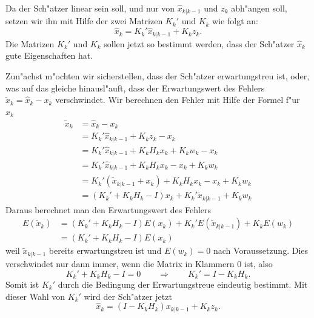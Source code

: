 Da der Sch"atzer linear sein soll, und nur von $\hat x_{k|k-1}$ und $z_{k}$
abh"angen soll, setzen wir ihn mit Hilfe der zwei Matrizen $K_k'$ und $K_k$
wie folgt an:
\[
\hat x_{k}=K_{k}' \hat x_{k|k-1}+K_{k} z_{k}.
\]
Die Matrizen $K_{k}'$ und $K_{k}$ sollen jetzt so bestimmt werden, dass der Sch"atzer
$\hat x_{k}$ gute Eigenschaften hat.

Zun"achst m"ochten wir sicherstellen, dass der Sch"atzer erwartungstreu ist,
oder, was auf das gleiche hinausl"auft, dass der Erwartungswert des Fehlers
$\tilde x_{k}=\hat x_{k}-x_{k}$ verschwindet.
Wir berechnen den Fehler
mit Hilfe der Formel f"ur $\hat x_{k}$
\begin{align*}
\tilde x_{k}&=\hat x_{k}-x_{k}\\
&=K_{k}'\hat x_{k|k-1}+K_{k}z_{k}-x_{k}\\
&=K_{k}'\hat x_{k|k-1}+K_{k}H_{k}x_{k} + K_{k}w_{k}-x_{k}\\
&=K_{k}'\hat x_{k|k-1}+K_{k}H_{k}x_{k} -x_{k} + K_{k}w_{k}\\
&=K_{k}'(\tilde x_{k|k-1}+x_{k})+K_{k}H_{k}x_{k}-x_{k}+K_{k}w_{k}\\
&=(K_{k}'+K_{k}H_{k}-I)x_{k}+K_{k}'\tilde x_{k|k-1}+K_kw_k
\end{align*}
Daraus berechnet man den Erwartungswert des Fehlers
\begin{align*}
E(\tilde x_{k})&=(K_{k}'+K_{k}H_{k}-I)E(x_{k})+K_{k}'E(\tilde x_{k|k-1})+K_{k}E(w_{k})\\
&=(K_{k}'+K_{k}H_{k}-I)E(x_{k})
\end{align*}
weil $\tilde x_{k|k-1}$ bereits erwartungstreu ist und $E(w_{k})=0$ nach Voraussetzung.
Dies verschwindet nur dann immer, wenn die Matrix in Klammern $0$ ist,
also
\[
K_{k}'+K_{k}H_{k}-I=0\qquad\Rightarrow\qquad K_{k}'=I-K_{k}H_{k}.
\]
Somit ist $K_{k}'$ durch die Bedingung der Erwartungstreue eindeutig bestimmt.
Mit dieser Wahl von $K_{k}'$ wird der Sch"atzer jetzt
\[
\hat x_{k}=(I-K_{k}H_{k})x_{k|k-1}+K_{k}z_{k}.
\]

